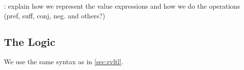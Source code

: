 \TODO: explain how we represent the value expressions and how we do the operations (pref, suff, conj, neg. and others?)







%
%
%
%

\subsection{The Logic}
We use the same syntax as in \cref{sec:rvltl}.

